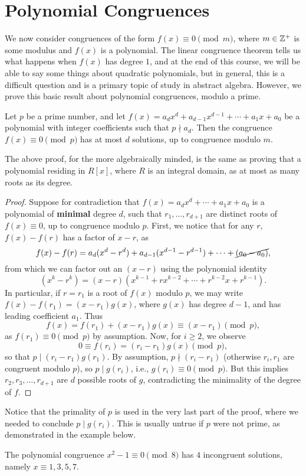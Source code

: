 \documentclass{article}
\begin{document}
\section{Polynomial Congruences}
We now consider congruences of the form $f(x) \equiv 0\pmod m$, where $m\in\mathbb Z^+$ is some modulus and $f(x)$ is a polynomial. The linear congruence theorem tells us what happens when $f(x)$ has degree $1$, and at the end of this course, we will be able to say some things about quadratic polynomials, but in general, this is a difficult question and is a primary topic of study in abstract algebra. However, we prove this basic result about polynomial congruences, modulo a prime.
\begin{theorem}
Let $p$ be a prime number, and let $f(x) = a_dx^d + a_{d-1}x^{d-1} + \cdots + a_1x + a_0$ be a polynomial with integer coefficients such that $p\nmid a_d$. Then the congruence $f(x) \equiv 0\pmod p$ has at most $d$ solutions, up to congruence modulo $m$.
\end{theorem}

The above proof, for the more algebraically minded, is the same as proving that a polynomial residing in $R[x]$, where $R$ is an integral domain, as at most as many roots as its degree.
\begin{proof}
Suppose for contradiction that $f(x) = a_dx^d + \cdots + a_1x + a_0$ is a polynomial of \textbf{minimal} degree $d$, such that $r_1, \ldots, r_{d+1}$ are distinct roots of $f(x)\equiv 0$, up to congruence modulo $p$. First, we notice that for any $r$, $f(x) - f(r)$ has a factor of $x-r$, as 
$$f(x) - f(r) = a_d(x^d - r^d) + a_{d-1}(x^{d-1} - r^{d-1}) + \cdots + \cancel{(a_0 - a_0)},$$
from which we can factor out an $(x-r)$ using the polynomial identity
$$(x^k - r^k) = (x-r)(x^{k-1} + rx^{k-2} + \cdots + r^{k-2}x + r^{k-1}).$$
In particular, if $r = r_1$ is a root of $f(x)$ modulo $p$, we may write $f(x) - f(r_1) = (x-r_1)g(x)$, where $g(x)$ has degree $d-1$, and has leading coefficient $a_1$. Thus
$$f(x) = f(r_1) + (x-r_1)g(x) \equiv (x-r_1) \pmod p,$$
as $f(r_1) \equiv 0\pmod p$ by assumption. Now, for $i\geq 2$, we observe
$$0\equiv f(r_i) = (r_i - r_1)g(x) \pmod p,$$
so that $p\mid (r_i-r_1)g(r_1)$. By assumption, $p\nmid (r_i - r_1)$ (otherwise $r_i, r_1$ are congruent modulo $p$), so $p\mid g(r_i)$, i.e., $g(r_i)\equiv 0\pmod p$. But this implies $r_2, r_3, \ldots, r_{d+1}$ are $d$ possible roots of $g$, contradicting the minimality of the degree of $f$.
\end{proof}

Notice that the primality of $p$ is used in the very last part of the proof, where we needed to conclude $p\mid g(r_i)$. This is usually untrue if $p$ were not prime, as demonstrated in the example below.
\begin{example}
The polynomial congruence $x^2 - 1 \equiv 0\pmod 8$ has $4$ incongruent solutions, namely $x \equiv \boxed{1,3,5,7}$.
\end{example}
\end{document}
